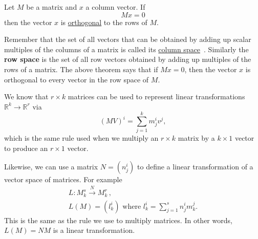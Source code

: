 \begin{theorem}
Let $M$ be a matrix and $x$ a column vector. If 
\[
Mx=0
\]
then the vector $x$ is \hyperlink{orthog}{orthogonal} to the rows of $M$.
\end{theorem}

\begin{remark}
Remember that the set of all vectors that can be obtained by adding up scalar multiples of the columns of a matrix is called its \hyperlink{column space}{column space}~. Similarly the {\bfseries row space} is the set of all row vectors obtained by adding up multiples of the rows of a matrix. The above theorem says that if $Mx=0$, then the vector $x$ is orthogonal to every vector in the row space of $M$.
\end{remark}



We know that $r\times k$ matrices can be used to represent linear transformations 
$ \mathbb{R}^k \rightarrow \mathbb{R}^r $
via \[(MV)^i = \sum_{j=1}^{k} m_j^iv^j , \] which is the same rule used when we multiply an $r\times k$ matrix by a $k\times 1$ vector to produce an $r\times1$ vector.

Likewise, we can use a matrix $N=(n^i_j)$ to define a linear transformation of a vector space of matrices. For example
\begin{gather*}
L \colon M^s_k \stackrel{N}{\longrightarrow} M^r_k\, ,\\
L(M)=(l^i_k) \mbox{ where } l^i_k= \sum_{j=1}^{s} n_j^im^j_k.
\end{gather*}
This is the same as the rule we use to multiply matrices. \hypertarget{leftmult}{In other words,} \(L(M)=NM\) is a linear transformation.

